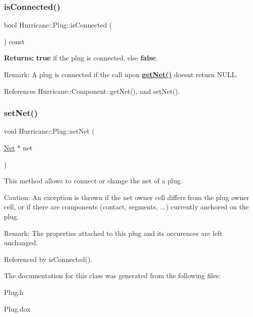 \subsubsection{\texorpdfstring{is\+Connected()}{isConnected()}}
{\footnotesize\ttfamily bool Hurricane\+::\+Plug\+::is\+Connected (\begin{DoxyParamCaption}{ }\end{DoxyParamCaption}) const\hspace{0.3cm}{\ttfamily [inline]}}

{\bfseries Returns\+:} {\bfseries true} if the plug is connected, else {\bfseries false}.

\begin{DoxyParagraph}{Remark\+:}
A plug is connected if the call upon {\bfseries \hyperlink{classHurricane_1_1Component_a1556ef77d6b89bfc17698d52ebde9791}{get\+Net()}} doesn\textquotesingle{}t return N\+U\+LL. 
\end{DoxyParagraph}


References Hurricane\+::\+Component\+::get\+Net(), and set\+Net().

\mbox{\label{classHurricane_1_1Plug_af5a0448a5cb0c4956f2f1b28f9c87530}} 
\subsubsection{\texorpdfstring{set\+Net()}{setNet()}}
{\footnotesize\ttfamily void Hurricane\+::\+Plug\+::set\+Net (\begin{DoxyParamCaption}\item[{\hyperlink{classHurricane_1_1Net}{Net} $\ast$}]{net }\end{DoxyParamCaption})}

This method allows to connect or change the net of a plug.

\begin{DoxyParagraph}{Caution\+:}
An exception is thrown if the net owner cell differs from the plug owner cell, or if there are components (contact, segments, ...) currently anchored on the plug.
\end{DoxyParagraph}
\begin{DoxyParagraph}{Remark\+:}
The properties attached to this plug and its occurences are left unchanged. 
\end{DoxyParagraph}


Referenced by is\+Connected().



The documentation for this class was generated from the following files\+:\begin{DoxyCompactItemize}
\item 
Plug.\+h\item 
Plug.\+dox\end{DoxyCompactItemize}
